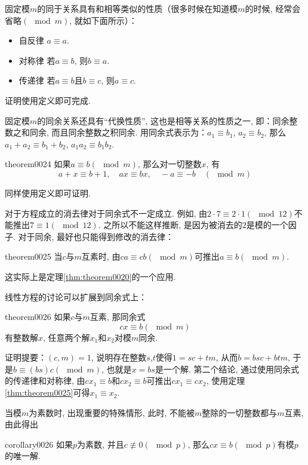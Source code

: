 固定模$m$的同于关系具有和相等类似的性质（很多时候在知道模$m$的时候, 经常会省略$(\mod{m})$, 就如下面所示）：
\begin{itemize}
\item 自反律 $a \equiv a$.
\item 对称律 若$a \equiv b$, 则$b \equiv a$.
\item 传递律 若$a \equiv b$且$b \equiv c$, 则$a \equiv c$.
\end{itemize}
证明使用定义即可完成. 

固定模$m$的同余关系还具有“代换性质”, 这也是相等关系的性质之一, 即：同余整数之和同余, 而且同余整数之积同余. 用同余式表示为：$a_1 \equiv b_1$, $a_2 \equiv b_2$, 那么$a_1+a_2 \equiv b_1+b_2$, $a_1a_2 \equiv b_1b_2$. 
\begin{theorem}{}{theorem0024}
如果$a \equiv b(\mod{m})$, 那么对一切整数$x$, 有
\[
a+x \equiv b+1, \quad ax \equiv bx, \quad  -a \equiv -b \quad (\mod{m})
\]
\end{theorem}

同样使用定义即可证明. 

对于方程成立的消去律对于同余式不一定成立. 例如, 由$2 \cdot 7 \equiv 2 \cdot 1(\mod{12})$不能推出$7 \equiv 1(\mod{12})$. 之所以不能这样推断, 是因为被消去的$2$是模的一个因子. 对于同余, 最好也只能得到修改的消去律：
\begin{theorem}{}{theorem0025}
当$c$与$m$互素时, 由$ca \equiv cb(\mod{m})$可推出$a \equiv b(\mod{m})$. 
\end{theorem}

这实际上是定理\ref{thm:theorem0020}的一个应用. 

线性方程的讨论可以扩展到同余式上：
\begin{theorem}{}{theorem0026}
如果$c$与$m$互素, 那同余式
\[
cx \equiv b(\mod{m})
\]
有整数解$x$, 任意两个解$x_1$和$x_2$对模$m$同余. 
\end{theorem}

证明提要：$(c,m)=1$, 说明存在整数$s$,$t$使得$1 = sc+tm$, 从而$b = bsc + btm$, 于是$b \equiv (bs)c(\mod{m})$, 也就是$x=bs$是一个解. 第二个结论, 通过使用同余式的传递律和对称律, 由$cx_1 \equiv b$和$cx_2 \equiv b$可推出$cx_1 \equiv cx_2$, 使用定理\ref{thm:theorem0025}可得$x_1 \equiv x_2$. 

当模$m$为素数时, 出现重要的特殊情形, 此时, 不能被$m$整除的一切整数都与$m$互素, 由此得出
\begin{corollary}{}{corollary0026}
如果$p$为素数, 并且$c \not\equiv 0(\mod{p})$, 那么$cx \equiv b(\mod{p})$有模$p$的唯一解. 
\end{corollary}

